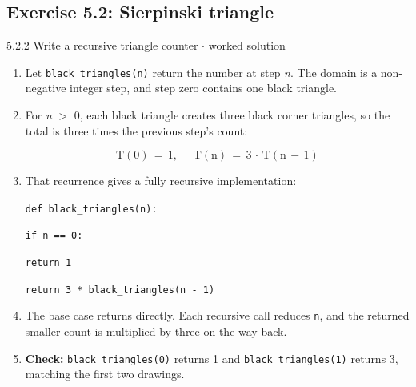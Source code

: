 \documentclass[11pt]{article}
\begin{document}
\begin{keepsection}\subsection{Exercise 5.2: Sierpinski triangle}

\begin{workedbox}{5.2.2 Write a recursive triangle counter \ensuremath{\cdot} worked solution}
\begin{enumerate}
\item Let \texttt{black\_triangles(n)} return the number at step \textit{n}. The domain is a non-negative integer step, and step zero contains one black triangle.
\item {}
For \textit{n} \ensuremath{>} 0, each black triangle creates three black corner triangles, so the total is three times the previous step's count:

\begin{equation*}\mathrm{T}(0)\, =\, 1,\, \quad \, \mathrm{T}(\mathrm{n})\, =\, 3\, \cdot \, \mathrm{T}(\mathrm{n}\, -\, 1)\end{equation*}
\item {}
That recurrence gives a fully recursive implementation:
\begin{tcolorbox}[colback=Paperblue,colframe=Paperblue,boxrule=0pt,arc=0pt,left=7pt,right=7pt,top=5pt,bottom=5pt]\small\sloppy
\noindent\hspace*{0em}\texttt{def black\_triangles(n):}\par
\noindent\hspace*{1em}\texttt{if n == 0:}\par
\noindent\hspace*{3em}\texttt{return 1}\par
\noindent\hspace*{1em}\texttt{return 3 * black\_triangles(n - 1)}\par
\end{tcolorbox}
\item The base case returns directly. Each recursive call reduces \texttt{n}, and the returned smaller count is multiplied by three on the way back.
\item \textbf{Check:} \texttt{black\_triangles(0)} returns 1 and \texttt{black\_triangles(1)} returns 3, matching the first two drawings.
\end{enumerate}
\end{workedbox}

\end{keepsection}
\end{document}
